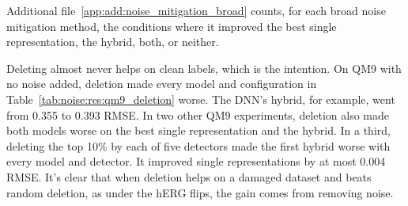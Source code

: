 Additional file~\ref{app:add:noise_mitigation_broad} counts, for each broad noise mitigation method, the conditions where it improved the best single representation, the hybrid, both, or neither.

Deleting almost never helps on clean labels, which is the intention. On QM9 with no noise added, deletion made every model and configuration in Table~\ref{tab:noise:res:qm9_deletion} worse. The DNN's hybrid, for example, went from 0.355 to 0.393 RMSE. In two other QM9 experiments, deletion also made both models worse on the best single representation and the hybrid. In a third, deleting the top 10\% by each of five detectors made the first hybrid worse with every model and detector. It improved single representations by at most 0.004 RMSE. It's clear that when deletion helps on a damaged dataset and beats random deletion, as under the hERG flips, the gain comes from removing noise.

